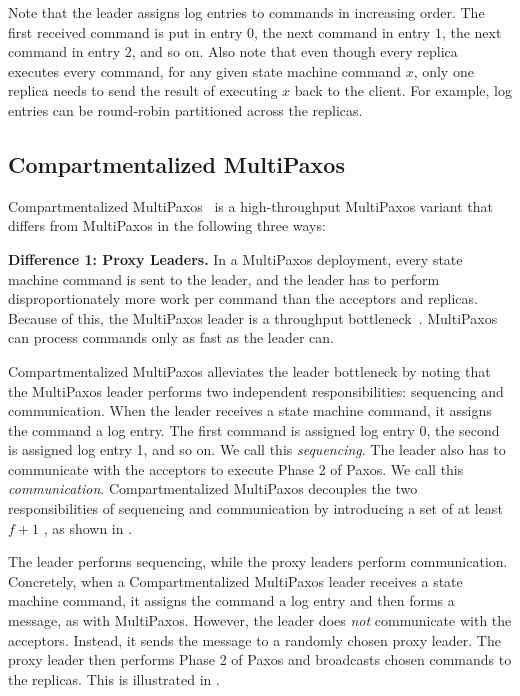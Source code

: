 Note that the leader assigns log entries to commands in increasing order. The
first received command is put in entry $0$, the next command in entry $1$, the
next command in entry $2$, and so on.
%
Also note that even though every replica executes every command, for any given
state machine command $x$, only one replica needs to send the result of
executing $x$ back to the client. For example, log entries can be round-robin
partitioned across the replicas.
%

\subsection{Compartmentalized MultiPaxos}
Compartmentalized MultiPaxos~\cite{whittaker2020compartmentalized} is a
high-throughput MultiPaxos variant that differs from MultiPaxos in the
following three ways:

\textbf{Difference 1: Proxy Leaders.}
In a MultiPaxos deployment, every state machine command is sent to the leader,
and the leader has to perform disproportionately more work per command than the
acceptors and replicas. Because of this, the MultiPaxos leader is a throughput
bottleneck~\cite{mao2008mencius, moraru2013there}. MultiPaxos can process
commands only as fast as the leader can.

Compartmentalized MultiPaxos alleviates the leader bottleneck by noting that
the MultiPaxos leader performs two independent responsibilities: sequencing and
communication. When the leader receives a state machine command, it assigns the
command a log entry. The first command is assigned log entry 0, the second is
assigned log entry 1, and so on. We call this \emph{sequencing}. The leader
also has to communicate with the acceptors to execute Phase 2 of Paxos. We call
this \emph{communication}. Compartmentalized MultiPaxos decouples the two
responsibilities of sequencing and communication by introducing a set of at
least $f+1$ , as shown in
.

{}

The leader performs sequencing, while the proxy leaders perform communication.
Concretely, when a Compartmentalized MultiPaxos leader receives a state machine
command, it assigns the command a log entry and then forms a 
message, as with MultiPaxos. However, the leader does \emph{not} communicate
with the acceptors. Instead, it sends the  message to a
randomly chosen proxy leader. The proxy leader then performs Phase 2 of Paxos
and broadcasts chosen commands to the replicas. This is illustrated in
.

